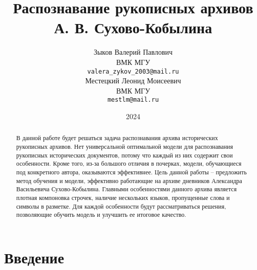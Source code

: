 \documentclass{extarticle}
\title{Распознавание рукописных архивов А. В. Сухово-Кобылина}
\author{ Зыков Валерий Павлович \\
	ВМК МГУ\\
	\texttt{valera\_zykov\_2003@mail.ru} \\
	\And
	Местецкий Леонид Моисеевич \\
	ВМК МГУ \\
	\texttt{mestlm@mail.ru} \\
}
\date{2024}
\begin{document}
\maketitle
\begin{abstract}
	В данной работе будет решаться задача распознавания архива исторических рукописных архивов.
	Нет универсальной оптимальной модели для распознавания рукописных исторических документов, потому что каждый из них содержит свои особенности. Кроме того, из-за большого отличия в почерках, модели, обучающиеся под конкретного автора, оказываются эффективнее.
	Цель данной работы -- предложить метод обучения и модели, эффективно работающие на архиве дневников Александра Васильевича Сухово-Кобылина. Главными особенностями данного архива является плотная компоновка строчек, наличие нескольких языков, пропущенные слова и символы в разметке. Для каждой особенности будут рассматриваться решения, позволяющие обучить модель и улучшить ее итоговое качество.
\end{abstract}


\section{Введение}
\end{document}
